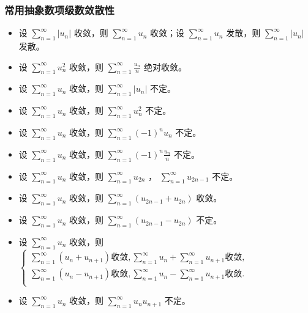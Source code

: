﻿\documentclass[a4paper,12pt,UTF8]{ctexart}
\begin{document}
    \subsubsection{常用抽象数项级数敛散性}
    \begin{itemize}
        \item 设 \(\sum \limits_{n=1}^{\infty } \left| u_n \right| \) 收敛，则 \(\sum \limits_{n=1}^{\infty } u_n\) 收敛；设 \(\sum \limits_{n=1}^{\infty } u_n\) 发散，则 \(\sum \limits_{n=1}^{\infty } \left| u_n \right| \) 发散。
        \item 设 \(\sum \limits_{n=1}^{\infty } u_n^2\) 收敛，则 \(\sum \limits_{n=1}^{\infty } \frac{u_n}{n}\) 绝对收敛。
        \item 设 \(\sum \limits_{n=1}^{\infty } u_n\) 收敛，则 \(\sum \limits_{n=1}^{\infty } \left| u_n \right| \) 不定。
        \item 设 \(\sum \limits_{n=1}^{\infty } u_n\) 收敛，则 \(\sum \limits_{n=1}^{\infty } u_n^2 \) 不定。
        \item 设 \(\sum \limits_{n=1}^{\infty } u_n\) 收敛，则 \(\sum \limits_{n=1}^{\infty } (-1)^{n} u_n \) 不定。
        \item 设 \(\sum \limits_{n=1}^{\infty } u_n\) 收敛，则 \(\sum \limits_{n=1}^{\infty } (-1)^{n} \frac{u_n}{n} \) 不定。
        \item 设 \(\sum \limits_{n=1}^{\infty } u_n\) 收敛，则 \(\sum \limits_{n=1}^{\infty } u_{2n} \) ， \(\sum \limits_{n=1}^{\infty } u_{2n-1} \) 不定。
        \item 设 \(\sum \limits_{n=1}^{\infty } u_n\) 收敛，则 \(\sum \limits_{n=1}^{\infty } (u_{2n-1} + u_{2n}) \) 收敛。
        \item 设 \(\sum \limits_{n=1}^{\infty } u_n\) 收敛，则 \(\sum \limits_{n=1}^{\infty } (u_{2n-1} - u_{2n}) \) 不定。
        \item 设 \(\sum \limits_{n=1}^{\infty } u_n\) 收敛，则 \(\begin{cases}
            \sum \limits_{n=1}^{\infty } (u_{n} + u_{n+1}) \text{收敛}, \sum \limits_{n=1}^{\infty } u_{n} + \sum \limits_{n=1}^{\infty } u_{n+1} \text{收敛},\\
            \sum \limits_{n=1}^{\infty } (u_{n} - u_{n+1}) \text{收敛}, \sum \limits_{n=1}^{\infty } u_{n} - \sum \limits_{n=1}^{\infty } u_{n+1} \text{收敛}.\\
        \end{cases} \) 
        \item 设 \(\sum \limits_{n=1}^{\infty } u_n\) 收敛，则 \(\sum \limits_{n=1}^{\infty } u_{n}u_{n+1} \) 不定。
    \end{itemize}
\end{document}
